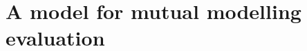 \documentclass[natbib]{svjour3}
\newcommand{\eg}{{\textit{e.g.\ }}}
\begin{document}
%
%
%
%

\section{A model for mutual modelling evaluation}
\end{document}
